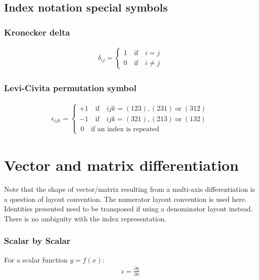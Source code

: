 \subsection{Index notation special symbols}

\subsubsection{ Kronecker delta }
\begin{align}
\delta_{ij} = \left\lbrace \begin{array}{c}
1 \quad\text{if}\quad i=j\\
0 \quad\text{if}\quad i\neq j
\end{array}
\right.
\end{align}


\subsubsection{ Levi-Civita permutation symbol }
\begin{align}
\epsilon_{ijk} = \left\lbrace \begin{array}{l}
+1  \quad\text{if}\quad ijk=(123),(231) \;\text{or}\; (312)\\
-1   \quad\text{if}\quad ijk=(321),(213) \;\text{or}\; (132)\\
\,0  \quad\text{if an index is repeated}
\end{array}
\right.
\end{align}



\section{Vector and matrix differentiation}

Note that the shape of vector/matrix resulting from a multi-axis differentiation is a question of layout convention. The numerator layout convention is used here. Identities presented need to be transposed if using a denominator layout instead. There is no ambiguity with the index representation.

\subsubsection{Scalar by Scalar}

For a scalar function $y = f(x)$: 
\begin{align}
z = \frac{\partial y}{\partial x}
\end{align}


